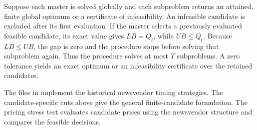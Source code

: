 Suppose each master is solved globally and each subproblem returns an attained, finite global optimum or a certificate of infeasibility. An infeasible candidate is excluded after its first evaluation. If the master selects a previously evaluated feasible candidate, its exact value gives \(LB=Q_t\), while \(UB\le Q_t\). Because \(LB\le UB\), the gap is zero and the procedure stops before solving that subproblem again. Thus the procedure solves at most \(T\) subproblems. A zero tolerance yields an exact optimum or an infeasibility certificate over the retained candidates.


The files in  implement the historical newsvendor timing strategies. The candidate-specific cuts above give the general finite-candidate formulation. The pricing stress test evaluates candidate prices using the newsvendor structure and compares the feasible decisions.
